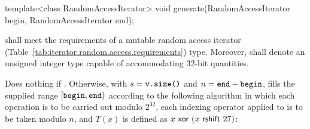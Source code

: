 %
\begin{itemdecl}
template<class RandomAccessIterator>
  void generate(RandomAccessIterator begin, RandomAccessIterator end);
\end{itemdecl}

\begin{itemdescr}
\pnum\requires {}
  shall meet the requirements of a mutable random access iterator
  (Table~\ref{tab:iterator.random.access.requirements}) type.
  Moreover,
  shall denote an unsigned integer type
  capable of accommodating 32-bit quantities.

\pnum\effects
 Does nothing if .
 Otherwise,
 with $ s = \texttt{v.size()} $
 and  $ n = \texttt{end} - \texttt{begin} $,
 fills the supplied range $[\texttt{begin},\texttt{end})$
 according to the following algorithm
 in which
 each operation is to be carried out modulo $2^{32}$,
 each indexing operator applied to  is to be taken modulo $n$,
 and $T(x)$ is defined as $ x \, \, \mathsf{xor} \, \, (x \, \, \mathsf{rshift} \, \, 27)$:


\end{itemdescr}

